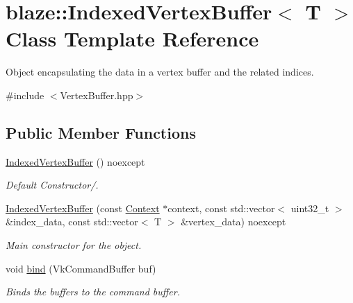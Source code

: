 \hypertarget{classblaze_1_1IndexedVertexBuffer}{}\section{blaze\+:\+:Indexed\+Vertex\+Buffer$<$ T $>$ Class Template Reference}
\label{classblaze_1_1IndexedVertexBuffer}


Object encapsulating the data in a vertex buffer and the related indices.  




{\ttfamily \#include $<$Vertex\+Buffer.\+hpp$>$}

\subsection*{Public Member Functions}
\begin{DoxyCompactItemize}
\item 
\mbox{\label{classblaze_1_1IndexedVertexBuffer_a3caf7bf67c51082014bc299fc483cfe8}} 
\hyperlink{classblaze_1_1IndexedVertexBuffer_a3caf7bf67c51082014bc299fc483cfe8}{Indexed\+Vertex\+Buffer} () noexcept
\begin{DoxyCompactList}\small\item\em Default Constructor/. \end{DoxyCompactList}\item 
\hyperlink{classblaze_1_1IndexedVertexBuffer_a3ba3cbc38b01607efe051c19e1d654d8}{Indexed\+Vertex\+Buffer} (const \hyperlink{classblaze_1_1Context}{Context} $\ast$context, const std\+::vector$<$ uint32\+\_\+t $>$ \&index\+\_\+data, const std\+::vector$<$ T $>$ \&vertex\+\_\+data) noexcept
\begin{DoxyCompactList}\small\item\em Main constructor for the object. \end{DoxyCompactList}\item 
void \hyperlink{classblaze_1_1IndexedVertexBuffer_a9b418a8f1c685c8326b4531afbcf2dbd}{bind} (Vk\+Command\+Buffer buf)
\begin{DoxyCompactList}\small\item\em Binds the buffers to the command buffer. \end{DoxyCompactList}\end{DoxyCompactItemize}
